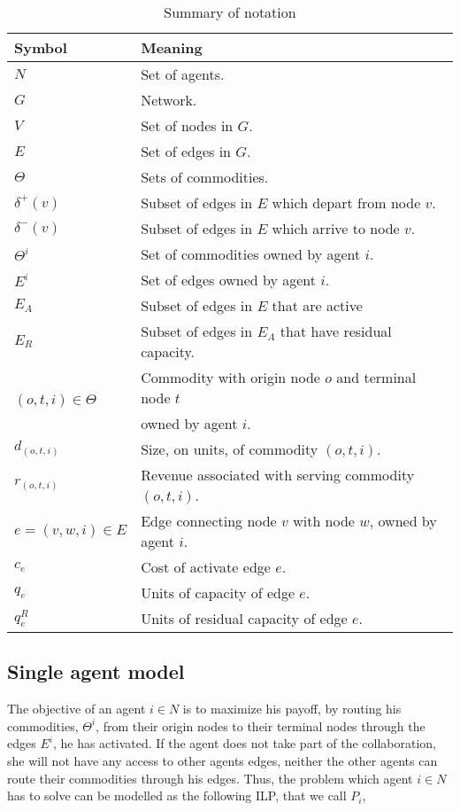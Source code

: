 \documentclass[review]{elsarticle}
\begin{document}
\begin{table}[ht!]
	\caption{Summary of notation \label{tb:notation}}
	\begin{tabular}{|l|l|}
	\hline
	Symbol & Meaning	 \\ \hline
	$N$ & Set of agents. \\
	$G$ & Network. \\
	$V$ & Set of nodes in $G$. \\
	$E$ & Set of edges in $G$. \\
	$\Theta$ & Sets of commodities. \\
	$\delta^+(v)$ & Subset of edges in $E$ which depart from node $v$.\\
	$\delta^-(v)$ & Subset of edges in $E$ which arrive to node $v$.\\	
	$\Theta^i$ & Set of commodities owned by agent $i$. \\	
	$E^i$ & Set of edges owned by agent $i$.\\
	$E_A$ & Subset of edges in $E$ that are active \\
	$E_R$ & Subset of edges in $E_A$ that have residual capacity.\\
	\multirow{2}{*}{$(o,t,i)\in \Theta$} & Commodity with origin node $o$ and terminal node $t$\\[-3pt]
	& owned by agent $i$. \\
	$d_{(o,t,i)}$ & Size, on units, of commodity $(o,t,i)$.\\
	$r_{(o,t,i)}$ & Revenue associated with serving commodity $(o,t,i)$.\\
	$e=(v,w,i)\in E$ & Edge connecting node $v$ with node $w$, owned by agent $i$.\\
	$c_e$ & Cost of activate edge $e$. \\
	$q_e$ & Units of capacity of edge $e$. \\
	$q_e^R$ & Units of residual capacity of edge $e$.\\
	\hline
	\end{tabular}
\end{table}

\subsection{Single agent model}

The objective of an agent $i \in N$ is to maximize his payoff, by routing his
commodities, $\Theta^i$, from their origin nodes to their terminal nodes through the edges $E^i$, he has activated. If the agent does not take part of the collaboration, she will not have any access to other agents edges, neither the other agents can route their commodities through his edges. Thus, the problem which agent $i\in N$ has to solve can be modelled as the following ILP, that we call $P_i$,
\end{document}
